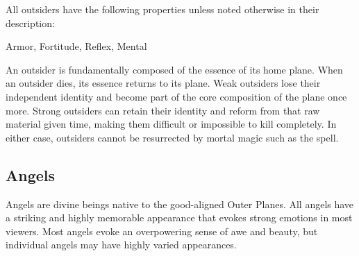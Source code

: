         All outsiders have the following properties unless noted otherwise in their description:
        
    
     Armor,
     Fortitude,
     Reflex,
     Mental
  
     An outsider is fundamentally composed of the essence of its home plane.
    When an outsider dies, its essence returns to its plane.
    Weak outsiders lose their independent identity and become part of the core composition of the plane once more.
    Strong outsiders can retain their identity and reform from that raw material given time, making them difficult or impossible to kill completely.
    In either case, outsiders cannot be resurrected by mortal magic such as the  spell.
  
      
    \subsection{Angels}
      
      Angels are divine beings native to the good-aligned Outer Planes.
      All angels have a striking and highly memorable appearance that evokes strong emotions in most viewers.
      Most angels evoke an overpowering sense of awe and beauty, but individual angels may have highly varied appearances.
    

      

